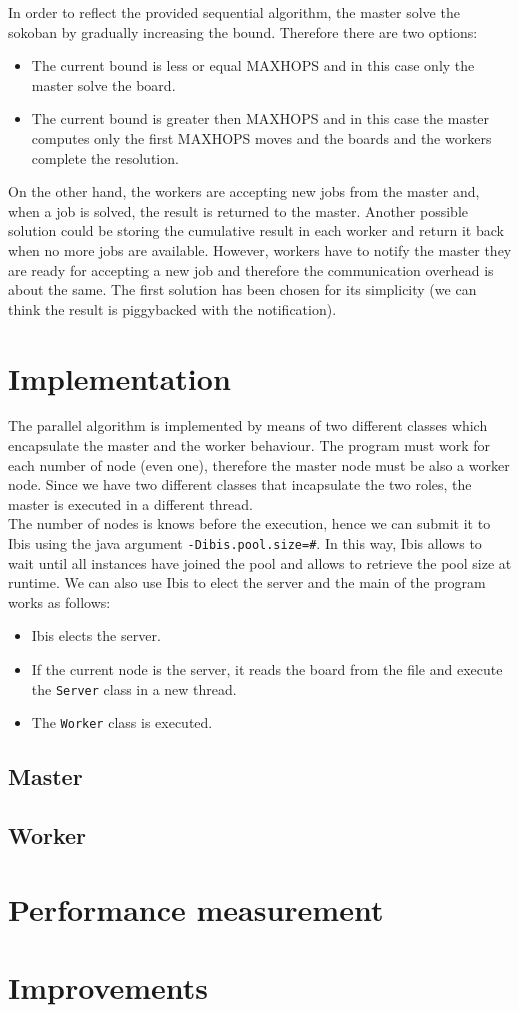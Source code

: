 \documentclass{article}
\begin{document}
In order to reflect the provided sequential algorithm, the master solve the sokoban by gradually increasing the bound. Therefore there are two options:
\begin{itemize}
    \item The current bound is less or equal MAXHOPS and in this case only the master solve the board.
    \item The current bound is greater then MAXHOPS and in this case the master computes only the first MAXHOPS moves and the boards and the workers complete the resolution.
\end{itemize}
On the other hand, the workers are accepting new jobs from the master and, when a job is solved, the result is returned to the master. Another possible solution could be storing the cumulative result in each worker and return it back when no more jobs are available. However, workers have to notify the master they are ready for accepting a new job and therefore the communication overhead is about the same. The first solution has been chosen for its simplicity (we can think the result is piggybacked with the notification).

\section{Implementation}
The parallel algorithm is implemented by means of two different classes which encapsulate the master and the worker behaviour. The program must work for each number of node (even one), therefore the master node must be also a worker node. Since we have two different classes that incapsulate the two roles, the master is executed in a different thread. \\
The number of nodes is knows before the execution, hence we can submit it to Ibis using the java argument \texttt{-Dibis.pool.size=#}. In this way, Ibis allows to wait until all instances have joined the pool and allows to retrieve the pool size at runtime. We can also use Ibis to elect the server and the main of the program works as follows:
\begin{itemize}
    \item Ibis elects the server.
    \item If the current node is the server, it reads the board from the file and execute the \texttt{Server} class in a new thread.
    \item The \texttt{Worker} class is executed.
\end{itemize}

\subsection{Master}

\subsection{Worker}

\section{Performance measurement}

\section{Improvements}
\end{document}

